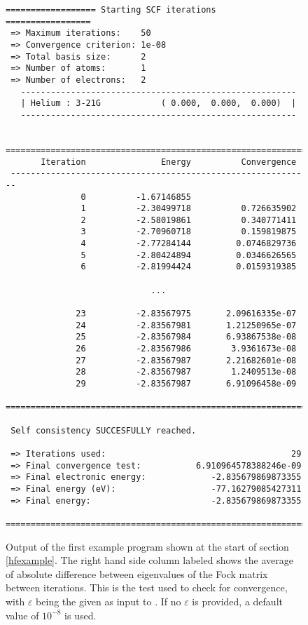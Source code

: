 \documentclass[../../master.tex]{subfiles}
\begin{document}
\begin{figure}[p]
\begin{lstlisting}[deletekeywords={int}]
 ================== Starting SCF iterations ================= 
 => Maximum iterations:    50         
 => Convergence criterion: 1e-08      
 => Total basis size:      2          
 => Number of atoms:       1          
 => Number of electrons:   2          
   ------------------------------------------------------- 
   | Helium : 3-21G            ( 0.000,  0.000,  0.000)  | 
   ------------------------------------------------------- 

 ============================================================ 
       Iteration               Energy          Convergence 
 ------------------------------------------------------------ 
               0          -1.67146855       
               1          -2.30499718          0.726635902 
               2          -2.58019861          0.340771411 
               3          -2.70960718          0.159819875 
               4          -2.77284144         0.0746829736 
               5          -2.80424894         0.0346626565 
               6          -2.81994424         0.0159319385 

                             ...                           

              23          -2.83567975       2.09616335e-07 
              24          -2.83567981       1.21250965e-07 
              25          -2.83567984       6.93867538e-08 
              26          -2.83567986        3.9361673e-08 
              27          -2.83567987       2.21682601e-08 
              28          -2.83567987        1.2409513e-08 
              29          -2.83567987       6.91096458e-09 
 ============================================================ 

 Self consistency SUCCESFULLY reached. 

 => Iterations used:                                     29   
 => Final convergence test:           6.910964578388246e-09 
 => Final electronic energy:             -2.835679869873355  
 => Final energy (eV):                   -77.16279085427311 
 => Final energy:                        -2.835679869873355 
 ============================================================
\end{lstlisting}
\caption{Output of the first example program shown at the start of section \ref{hfexample}. The right hand side column labeled  shows the average of absolute difference between eigenvalues of the Fock matrix between iterations. This is the test used to check for convergence, with $\varepsilon$ being the  given as input to . If no $\varepsilon$ is provided, a default value of $10^{-8}$ is used. \label{fig:hfexamplefig}}
\end{figure}
\end{document}
